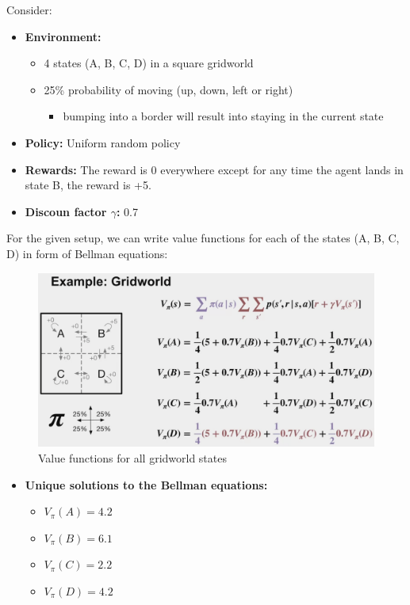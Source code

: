 \documentclass[12pt, a4paper]{article}
\begin{document}
Consider:

\begin{itemize}
  \item \textbf{Environment:}
  \begin{itemize}
    \item 4 states (A, B, C, D) in a square gridworld
    \item 25\% probability of moving (up, down, left or right)
    \begin{itemize}
      \item bumping into a border will result into staying in the current state
    \end{itemize}
  \end{itemize}
  \item \textbf{Policy:} Uniform random policy
  \item \textbf{Rewards:} The reward is 0 everywhere except for any time the agent lands in state B, the reward is +5.
  \item \textbf{Discoun factor $\gamma$:} 0.7
\end{itemize}

For the given setup, we can write value functions for each of the states (A, B, C, D) in form of Bellman equations:

\begin{figure}[H]
  \centering  %
    \includegraphics[width=0.9\columnwidth]{images/gridworld-eg.png}
    \caption{Value functions for all gridworld states}
    \label{fig:gridworld-eg}
\end{figure}
\begin{itemize}
  \item \textbf{Unique solutions to the Bellman equations:}
  \begin{itemize}
    \item $V_\pi(A) = 4.2$
    \item $V_\pi(B) = 6.1$
    \item $V_\pi(C) = 2.2$
    \item $V_\pi(D) = 4.2$
  \end{itemize}
\end{itemize}
\end{document}
